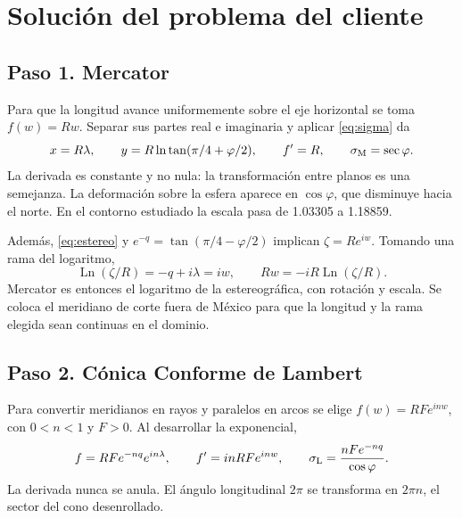 \section{Solución del problema del cliente}
\subsection{Paso 1. Mercator}
Para que la longitud avance uniformemente sobre el eje horizontal se toma $f(w)=Rw$. Separar sus partes real e imaginaria y aplicar \eqref{eq:sigma} da
\begin{equation}
 x=R\lambda,\qquad y=R\ln\tan(\pi/4+\varphi/2),\qquad
 f'=R,\qquad \sigma_{\rm M}=\sec\varphi.
 \label{eq:mercator}
\end{equation}
La derivada es constante y no nula: la transformación entre planos es una semejanza. La deformación sobre la esfera aparece en $\cos\varphi$, que disminuye hacia el norte. En el contorno estudiado la escala pasa de 1.03305 a 1.18859.

Además, \eqref{eq:estereo} y $e^{-q}=\tan(\pi/4-\varphi/2)$ implican $\zeta=Re^{iw}$. Tomando una rama del logaritmo,
\begin{equation}
 \operatorname{Ln}(\zeta/R)=-q+i\lambda=iw,\qquad
 Rw=-iR\operatorname{Ln}(\zeta/R).
 \label{eq:mercator_log}
\end{equation}
Mercator es entonces el logaritmo de la estereográfica, con rotación y escala. Se coloca el meridiano de corte fuera de México para que la longitud y la rama elegida sean continuas en el dominio.

\subsection{Paso 2. Cónica Conforme de Lambert}
Para convertir meridianos en rayos y paralelos en arcos se elige $f(w)=RF e^{inw}$, con $0<n<1$ y $F>0$. Al desarrollar la exponencial,
\begin{equation}
 f=RF e^{-nq}e^{in\lambda},\qquad
 f'=inRF e^{inw},\qquad
 \sigma_{\rm L}=\frac{nF e^{-nq}}{\cos\varphi}.
 \label{eq:lambert}
\end{equation}
La derivada nunca se anula. El ángulo longitudinal $2\pi$ se transforma en $2\pi n$, el sector del cono desenrollado.

